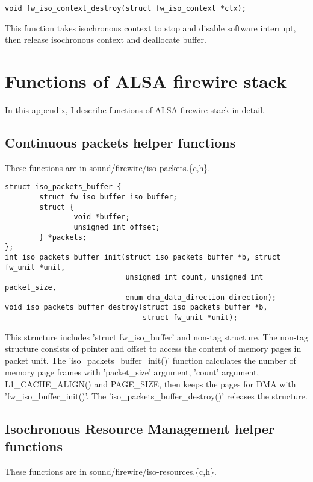 \documentclass[onecolumn]{article}
\begin{document}
\begin{verbatim}
void fw_iso_context_destroy(struct fw_iso_context *ctx);
\end{verbatim}

This function takes isochronous context to stop and disable software interrupt, then release isochronous context and deallocate buffer.

\newpage

\section{Functions of ALSA firewire stack}

In this appendix, I describe functions of ALSA firewire stack in detail.

\subsection{Continuous packets helper functions}

These functions are in sound/firewire/iso-packets.\{c,h\}.

\begin{verbatim}
struct iso_packets_buffer {
        struct fw_iso_buffer iso_buffer;
        struct {
                void *buffer;
                unsigned int offset;
        } *packets;
};
int iso_packets_buffer_init(struct iso_packets_buffer *b, struct fw_unit *unit,
                            unsigned int count, unsigned int packet_size,
                            enum dma_data_direction direction);
void iso_packets_buffer_destroy(struct iso_packets_buffer *b,
                                struct fw_unit *unit);
\end{verbatim}

This structure includes 'struct fw\_iso\_buffer' and non-tag structure. The non-tag structure consists of pointer and offset to access the content of memory pages in packet unit. The 'iso\_packets\_buffer\_init()' function calculates the number of memory page frames with 'packet\_size' argument, 'count' argument, L1\_CACHE\_ALIGN() and PAGE\_SIZE, then keeps the pages for DMA with 'fw\_iso\_buffer\_init()'. The 'iso\_packets\_buffer\_destroy()' releases the structure.

\subsection{Isochronous Resource Management helper functions}

These functions are in sound/firewire/iso-resources.\{c,h\}.
\end{document}
